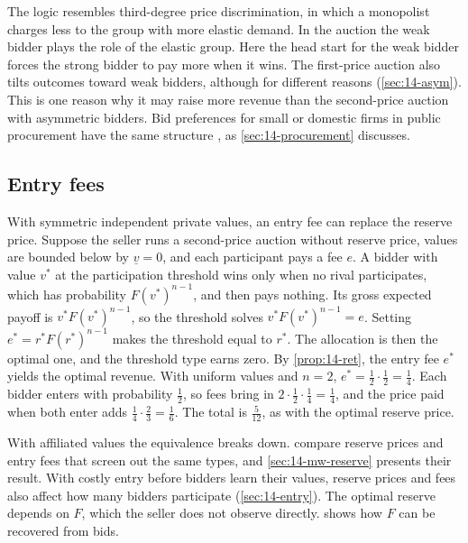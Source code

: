 The logic resembles third-degree price discrimination, in which a monopolist charges less to the group with more elastic demand. In the auction the weak bidder plays the role of the elastic group. Here the head start for the weak bidder forces the strong bidder to pay more when it wins. The first-price auction also tilts outcomes toward weak bidders, although for different reasons (\cref{sec:14-asym}). This is one reason why it may raise more revenue than the second-price auction with asymmetric bidders. Bid preferences for small or domestic firms in public procurement have the same structure \citep{McAfeeMcMillan1989}, as \cref{sec:14-procurement} discusses.

\subsection{Entry fees}\label{sec:14-optimal-fees}

With symmetric independent private values, an entry fee can replace the reserve price. Suppose the seller runs a second-price auction without reserve price, values are bounded below by $\underline v=0$, and each participant pays a fee $e$. A bidder with value $v^*$ at the participation threshold wins only when no rival participates, which has probability $F(v^*)^{n-1}$, and then pays nothing. Its gross expected payoff is $v^*F(v^*)^{n-1}$, so the threshold solves $v^*F(v^*)^{n-1}=e$. Setting $e^*=r^*F(r^*)^{n-1}$ makes the threshold equal to $r^*$. The allocation is then the optimal one, and the threshold type earns zero. By \cref{prop:14-ret}, the entry fee $e^*$ yields the optimal revenue. With uniform values and $n=2$, $e^*=\frac12\cdot\frac12=\frac14$. Each bidder enters with probability $\frac12$, so fees bring in $2\cdot\frac12\cdot\frac14=\frac14$, and the price paid when both enter adds $\frac14\cdot\frac23=\frac16$. The total is $\frac{5}{12}$, as with the optimal reserve price.

With affiliated values the equivalence breaks down.  compare reserve prices and entry fees that screen out the same types, and \cref{sec:14-mw-reserve} presents their result. With costly entry before bidders learn their values, reserve prices and fees also affect how many bidders participate (\cref{sec:14-entry}). The optimal reserve depends on $F$, which the seller does not observe directly.  shows how $F$ can be recovered from bids.

